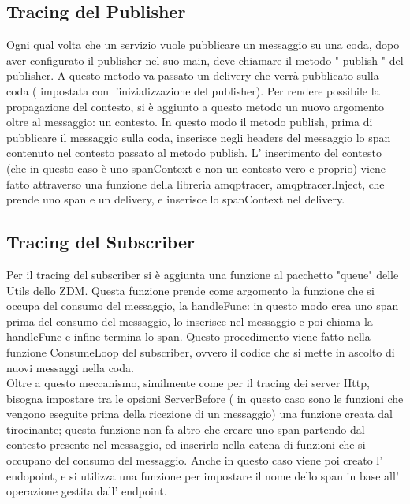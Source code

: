 \documentclass[a4paper,12pt,titlepage,italian,openany]{report}
\begin{document}
\subsection{Tracing del Publisher}
Ogni qual volta che un servizio vuole pubblicare un messaggio su una coda, dopo aver configurato il publisher nel suo main, deve chiamare il metodo " publish " del publisher. A questo metodo va passato un delivery che verrà pubblicato sulla coda ( impostata con l'inizializzazione del publisher). Per rendere possibile la propagazione del contesto, si è aggiunto a questo metodo un nuovo argomento oltre al messaggio: un contesto. In questo modo il metodo publish, prima di pubblicare il messaggio sulla coda, inserisce negli headers del messaggio lo span contenuto nel contesto passato al metodo publish.
L' inserimento del contesto (che in questo caso è uno spanContext e non un contesto vero e proprio) viene fatto attraverso una funzione della libreria amqptracer, amqptracer.Inject, che prende uno span e un delivery, e inserisce lo spanContext nel delivery.
\subsection{Tracing del Subscriber}
Per il tracing del subscriber si è aggiunta una funzione al pacchetto "queue" delle Utils dello ZDM\cite{zdm:1}. Questa funzione prende come argomento la funzione che si occupa del consumo del messaggio, la handleFunc:
in questo modo crea uno span prima del consumo del messaggio, lo inserisce nel messaggio e poi chiama la handleFunc e infine termina lo span. Questo procedimento viene fatto nella funzione ConsumeLoop del subscriber, ovvero il codice che si mette in ascolto di nuovi messaggi nella coda.
\\Oltre a questo meccanismo, similmente come per il tracing dei server Http, bisogna impostare tra le opsioni ServerBefore ( in questo caso sono le funzioni che vengono eseguite prima della ricezione di un messaggio) una funzione creata dal tirocinante; questa funzione non fa altro che creare uno span partendo dal contesto presente nel messaggio, ed inserirlo nella catena di funzioni che si 
occupano del consumo del messaggio. Anche in questo caso viene poi creato l' endopoint,  e si utilizza una funzione per impostare il nome dello span in base all' operazione gestita dall' endpoint.

\newpage
\end{document}
